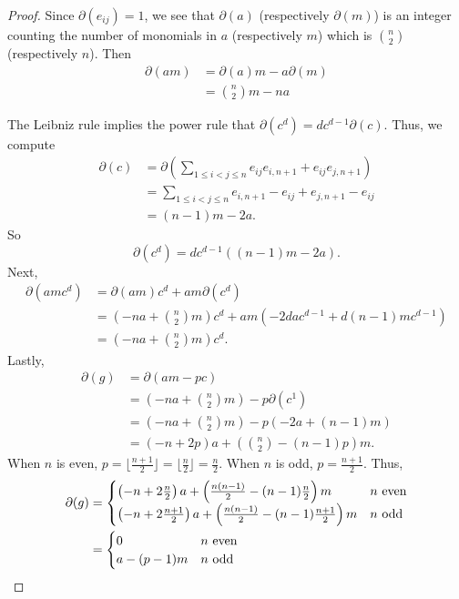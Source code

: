\documentclass{amsart}
\begin{document}
\begin{proof}
    Since $\partial(e_{ij})=1$, we see that $\partial(a)$ (respectively $\partial(m)$) is an integer counting the number of monomials in $a$ (respectively $m$) which is $\binom{n}{2}$ (respectively $n$).
    Then
    \begin{align*}
        \partial(am)
        &= \partial(a)m - a \partial(m)\\
        &= \binom{n}{2}m - na
    \end{align*}

    The Leibniz rule implies the power rule that $\partial(c^d) = dc^{d-1}\partial(c)$.
    Thus, we compute
    \begin{align*}
        \partial(c) &= \partial\left( \sum_{1 \leq i < j \leq n} e_{ij}e_{i,n+1} + e_{ij}e_{j,n+1}\right) \\
        &=\sum_{1 \leq i < j \leq n} e_{i,n+1} - e_{ij} + e_{j,n+1} - e_{ij}\\
        &=(n-1) m - 2a.
    \end{align*}
    So
    \[\partial(c^d) = dc^{d-1}\left((n-1)m - 2a\right).\]
    Next,
    \begin{align*}
        \partial(amc^d)
        &= \partial(am)c^d + am \partial(c^d)\\
        &= \left( -na + \binom{n}{2}m \right) c^d + am \left(-2dac^{d-1} + d(n-1)mc^{d-1}\right)\\
        &= \left( -na + \binom{n}{2} m \right) c^d.
    \end{align*}
    Lastly,
    \begin{align*}
        \partial(g)
        &= \partial(am - pc)\\
        &= (-na + \binom{n}{2}m) - p \partial(c^1)\\
        &= (-na + \binom{n}{2}m) - p \left(-2a + (n-1)m \right)\\
        &= \left(-n +2p\right) a + \left(\binom{n}{2} -(n-1)p\right) m.
    \end{align*}
    When $n$ is even, $p = \lfloor\frac{n+1}{2} \rfloor = \lfloor\frac{n}{2}\rfloor = \frac{n}{2}$.
    When $n$ is odd, $p = \frac{n+1}{2}$.
    Thus,
    \begin{align*}
        \partial(g)
        &=
        \begin{cases}
           \left (-n+ 2 \frac{n}{2} \right)a + \left( \frac{n(n-1)}{2} - (n-1)\frac{n}{2}\right)m & n~\text{even}\\
           \left (-n+ 2 \frac{n+1}{2} \right)a + \left( \frac{n(n-1)}{2} - (n-1)\frac{n+1}{2}\right)m  & n~\text{odd}
        \end{cases}\\
        &=
        \begin{cases}
            0 & n~\text{even}\\
            a - (p-1)m& n~\text{odd}
        \end{cases}
        \qedhere
    \end{align*}
\end{proof}
\end{document}
